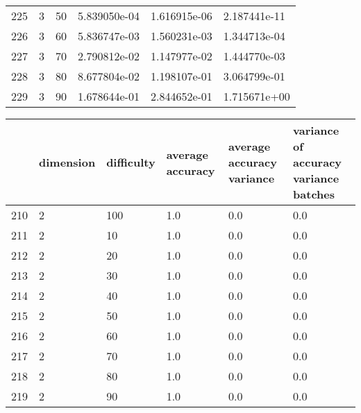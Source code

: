 \documentclass{article}
\begin{document}
\begin{center}
\begin{tabular}{llllll}
225 &         3 &         50 &  5.839050e-04 &          1.616915e-06 &                      2.187441e-11 \\
226 &         3 &         60 &  5.836747e-03 &          1.560231e-03 &                      1.344713e-04 \\
227 &         3 &         70 &  2.790812e-02 &          1.147977e-02 &                      1.444770e-03 \\
228 &         3 &         80 &  8.677804e-02 &          1.198107e-01 &                      3.064799e-01 \\
229 &         3 &         90 &  1.678644e-01 &          2.844652e-01 &                      1.715671e+00 \\
\bottomrule
\end{tabular}
\end{center}
\begin{center}
\begin{tabular}{llllll}
\toprule
{} & dimension & difficulty & average accuracy & average accuracy variance & variance of accuracy variance batches \\
\midrule
210 &         2 &        100 &              1.0 &                       0.0 &                                   0.0 \\
211 &         2 &         10 &              1.0 &                       0.0 &                                   0.0 \\
212 &         2 &         20 &              1.0 &                       0.0 &                                   0.0 \\
213 &         2 &         30 &              1.0 &                       0.0 &                                   0.0 \\
214 &         2 &         40 &              1.0 &                       0.0 &                                   0.0 \\
215 &         2 &         50 &              1.0 &                       0.0 &                                   0.0 \\
216 &         2 &         60 &              1.0 &                       0.0 &                                   0.0 \\
217 &         2 &         70 &              1.0 &                       0.0 &                                   0.0 \\
218 &         2 &         80 &              1.0 &                       0.0 &                                   0.0 \\
219 &         2 &         90 &              1.0 &                       0.0 &                                   0.0 \\

\end{tabular}
\end{center}
\end{document}
